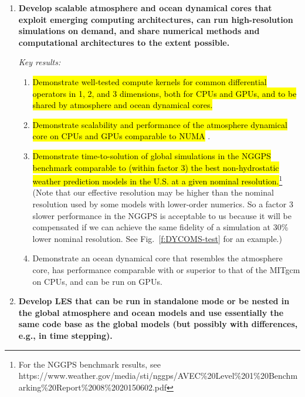 \documentclass{article}
\newcommand{\hlg}[1]{{\sethlcolor{green}\hl{#1}}}
\begin{document}
\begin{enumerate}
    \item \textbf{Develop scalable atmosphere and ocean dynamical cores that exploit emerging computing architectures, can run high-resolution simulations on demand, and share numerical methods and computational architectures to the extent possible.}
        
    \emph{Key results:}
    \begin{enumerate}
        \item \hlg{Demonstrate well-tested compute kernels for common differential operators in 1, 2, and 3 dimensions, both for CPUs and GPUs, and to be shared by atmosphere and ocean dynamical cores.}
        \item \hlg{Demonstrate scalability and performance of the atmosphere dynamical core on CPUs and GPUs comparable to NUMA} \citep{abdi:2016b,abdi:2018,mueller:2016}. 
        \item \hlg{Demonstrate time-to-solution of global simulations in the  NGGPS benchmark comparable to (within factor 3) the best non-hydrostatic weather prediction models in the U.S. at a given nominal resolution.}\footnote{For the NGGPS benchmark results, see https://www.weather.gov/media/sti/nggps/AVEC\%20Level\%201\%20Benchmarking\%20Report\%2008\%2020150602.pdf} (Note that our effective resolution may be higher than the nominal resolution used by some models with lower-order numerics. So a factor 3 slower performance in the NGGPS is acceptable to us because it will be compensated if we can achieve the same fidelity of a simulation at 30\% lower nominal resolution. See Fig.~\ref{f:DYCOMS-test} for an example.)
        \item Demonstrate an ocean dynamical core that resembles the atmosphere core, has performance comparable with or superior to that of the MITgcm on CPUs, and can be run on GPUs.
    \end{enumerate}
 
 \item \textbf{Develop LES that can be run in standalone mode or be nested in the global atmosphere and ocean models and use essentially the same code base as the global models (but possibly with differences, e.g., in time stepping).}
 

\end{enumerate}
\end{document}
